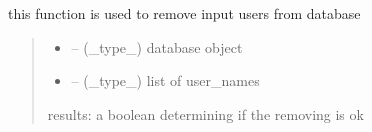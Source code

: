 \documentclass[letterpaper,10pt,english]{sphinxmanual}
\begin{document}
\begin{savenotes}\begin{fulllineitems}
\label{\detokenize{setting/backend/user_management_funcs:oxin.backend.user_management_funcs.remove_users_from_db}}
\pysigstartsignatures
{}
\pysigstopsignatures
\sphinxAtStartPar
this function is used to remove input users from database
\begin{quote}\begin{description}
\begin{itemize}
\item {} 
\sphinxAtStartPar
{} – (\_type\_) database object

\item {} 
\sphinxAtStartPar
{} – (\_type\_) list of user\_names

\end{itemize}

\sphinxAtStartPar
results: a boolean determining if the removing is ok

\end{description}\end{quote}

\end{fulllineitems}\end{savenotes}

\end{document}
